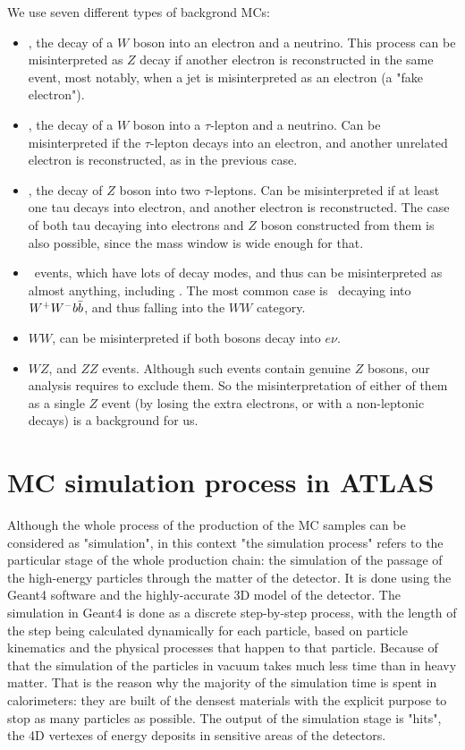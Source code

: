 We use seven different types of backgrond MCs:
\begin{itemize}
\item \Wenu, the decay of a $W$ boson into an electron and a neutrino. This process can be misinterpreted as $Z$ decay if another electron is reconstructed in the same event, most notably, when a jet is misinterpreted as an electron (a "fake electron").
\item \Wtau, the decay of a $W$ boson into a $\tau$-lepton and a neutrino. Can be misinterpreted if the $\tau$-lepton decays into an electron, and another unrelated electron is reconstructed, as in the previous case.
\item \Ztau, the decay of $Z$ boson into two $\tau$-leptons. Can be misinterpreted if at least one tau decays into electron, and another electron is reconstructed. The case of both tau decaying into electrons and $Z$ boson constructed from them is also possible, since the mass window is wide enough for that.
\item \ttbar\ events, which have lots of decay modes, and thus can be misinterpreted as almost anything, including \Zee. The most common case is \ttbar\ decaying into $W^{+}W^{-}b\bar{b}$, and thus falling into the $WW$ category.
\item $WW$, can be misinterpreted if both bosons decay into $e\nu$.
\item $WZ$, and $ZZ$ events. Although such events contain genuine $Z$ bosons, our analysis requires to exclude them. So the misinterpretation of either of them as a single $Z$ event (by losing the extra electrons, or with a non-leptonic decays) is a background for us.
\end{itemize}

\section{MC simulation process in ATLAS}
\label{sec:MC_sim}

Although the whole process of the production of the MC samples can be considered as "simulation", in this context "the simulation process" refers to the particular stage of the whole production chain: the simulation of the passage of the high-energy particles through the matter of the detector. It is done using the Geant4 software and the highly-accurate 3D model of the detector. The simulation in Geant4 is done as a discrete step-by-step process, with the length of the step being calculated dynamically for each particle, based on particle kinematics and the physical processes that happen to that particle. Because of that the simulation of the particles in vacuum takes much less time than in heavy matter. That is the reason why the majority of the simulation time is spent in calorimeters: they are built of the densest materials with the explicit purpose to stop as many particles as possible. The output of the simulation stage is "hits", the 4D vertexes of energy deposits in sensitive areas of the detectors.

